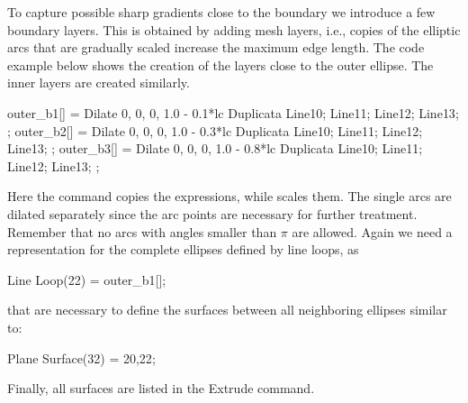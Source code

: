 %
%
%
To capture possible sharp gradients close to the boundary we introduce a few boundary layers. 
This is obtained by 
adding mesh layers, i.e., copies of the elliptic arcs that are gradually scaled increase the maximum edge length. The code example below shows the creation of the layers close to the outer ellipse. The inner layers are created similarly.
\begin{gencode}
outer_b1[] = Dilate {{0, 0, 0}, 1.0 - 0.1*lc } {
Duplicata{  Line{10}; Line{11}; Line{12}; Line{13}; } };
outer_b2[] = Dilate {{0, 0, 0}, 1.0 - 0.3*lc } {
Duplicata{  Line{10}; Line{11}; Line{12}; Line{13}; } };
outer_b3[] = Dilate {{0, 0, 0}, 1.0 - 0.8*lc } {
Duplicata{  Line{10}; Line{11}; Line{12}; Line{13}; } };
\end{gencode}
Here the command  copies the expressions, while  scales them.    
The single arcs are dilated separately since the arc points are necessary for further treatment. Remember that no arcs with angles smaller than $\pi$ are allowed. Again we need a representation for the complete ellipses defined by line loops, as
\begin{gencode}
Line Loop(22) = {outer_b1[]};
\end{gencode}
that are necessary to define the surfaces between all neighboring ellipses similar to:
\begin{gencode}
Plane Surface(32) = {20,22};
\end{gencode}
Finally, all surfaces are listed in the Extrude command.


